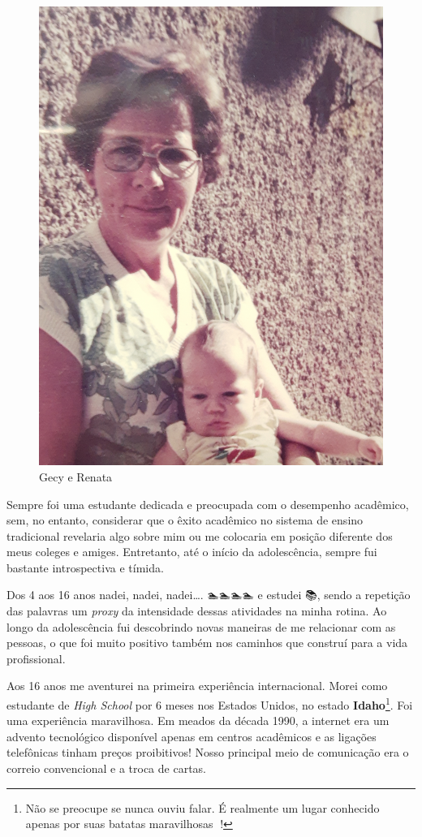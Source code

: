 \documentclass[
]{book}
\begin{document}
\begin{figure}
\includegraphics[width=1\linewidth]{img/gecy} \caption{Gecy e Renata}\label{fig:gecy}
\end{figure}

Sempre foi uma estudante dedicada e preocupada com o desempenho
acadêmico, sem, no entanto, considerar que o êxito acadêmico no sistema
de ensino tradicional revelaria algo sobre mim ou me colocaria em
posição diferente dos meus coleges e amiges. Entretanto, até o início da
adolescência, sempre fui bastante introspectiva e tímida.

Dos 4 aos 16 anos nadei, nadei, nadei\ldots. 🏊🏊🏊🏊 e estudei 📚, sendo a
repetição das palavras um \emph{proxy} da intensidade dessas atividades
na minha rotina. Ao longo da adolescência fui descobrindo novas maneiras
de me relacionar com as pessoas, o que foi muito positivo também nos
caminhos que construí para a vida profissional.

Aos 16 anos me aventurei na primeira experiência internacional. Morei
como estudante de \emph{High School} por 6 meses nos Estados Unidos, no
estado \textbf{Idaho}\footnote{Não se preocupe se nunca ouviu falar. É
  realmente um lugar conhecido apenas por suas batatas maravilhosas 🥔!}.
Foi uma experiência maravilhosa. Em meados da década 1990, a internet
era um advento tecnológico disponível apenas em centros acadêmicos e as
ligações telefônicas tinham preços proibitivos! Nosso principal meio de
comunicação era o correio convencional e a troca de cartas.
\end{document}
